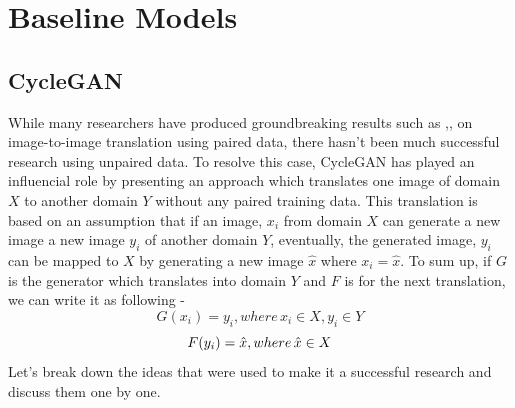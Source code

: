 \section{Baseline Models}
\subsection{CycleGAN}

While many researchers have produced groundbreaking results such as \cite{pix2pix} ,\cite{sketch-color}, \cite{outdoor} on image-to-image translation using paired data, there hasn't been much successful research using unpaired data. To resolve this case, CycleGAN \cite{cyclegan} has played an influencial role by presenting an approach which translates one image of domain $X$ to another domain $Y$ without any paired training data. This translation is based on an assumption that if an image, $x_i$ from domain $X$ can generate a new image a new image $y_i$ of another domain $Y$, eventually, the generated image, $y_i$ can be mapped to $X$ by generating a new image $\hat{x}$ where \(x_i = \hat{x}\). To sum up, if $G$ is the generator which translates into domain $Y$ and $F$ is for the next translation, we can write it as following -
\begin{equation} \label{eq:ccl1}
G(x_i) = y_i, where\, x_i \in X, y_i \in Y
\end{equation}
\begin{equation} \label{equ:ccl2}
F(y_i)  = \Hat{x}, where\, \Hat{x} \in X 
\end{equation}
Let's break down the ideas that were used to make it a successful research and discuss them one by one.

